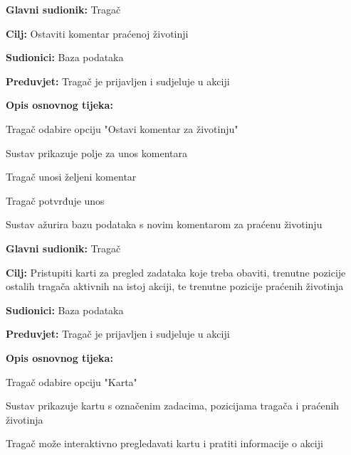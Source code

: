					\noindent {}
					\begin{packed_item}
						
						\item \textbf{Glavni sudionik:} Tragač
						\item \textbf{Cilj:} Ostaviti komentar praćenoj životinji 
						\item \textbf{Sudionici:} Baza podataka
						\item \textbf{Preduvjet:} Tragač je prijavljen i sudjeluje u akciji
						\item \textbf{Opis osnovnog tijeka:}
						
						\item[] \begin{packed_enum}
							
							\item Tragač odabire opciju "Ostavi komentar za životinju" 
							\item Sustav prikazuje polje za unos komentara 
							\item Tragač unosi željeni komentar 
							\item Tragač potvrđuje unos 
							\item Sustav ažurira bazu podataka s novim komentarom za praćenu životinju 
						\end{packed_enum}
					\end{packed_item}
					
					\noindent \underbar{\textbf{UC23 - Pregled karte}}
					\begin{packed_item}
						
						\item \textbf{Glavni sudionik:} Tragač
						\item \textbf{Cilj:} Pristupiti karti za pregled zadataka koje treba obaviti, trenutne pozicije ostalih tragača aktivnih na istoj akciji, te trenutne pozicije praćenih životinja
						\item \textbf{Sudionici:} Baza podataka
						\item \textbf{Preduvjet:} Tragač je prijavljen i sudjeluje u akciji 
						\item \textbf{Opis osnovnog tijeka:}
						
						\item[] \begin{packed_enum}
							
							\item Tragač odabire opciju "Karta" 
							\item Sustav prikazuje kartu s označenim zadacima, pozicijama tragača i praćenih životinja 
							\item Tragač može interaktivno pregledavati kartu i pratiti informacije o akciji
						\end{packed_enum}
					\end{packed_item}
					
